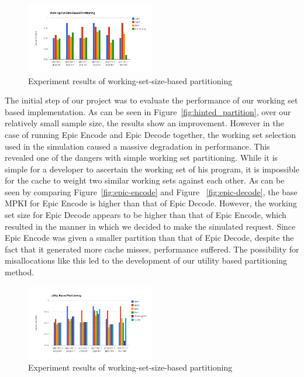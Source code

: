 \documentclass{acm_proc_article-sp}
\begin{document}
\begin{figure}
  \includegraphics[width=0.5\textwidth]{figs/work_set_size_hit_ratio.png}
  \caption{Experiment results of working-set-size-based partitioning}
  \label{fig:work_set_results}
\end{figure}

The initial step of our project was to evaluate the performance of our working set based implementation. As can be seen in Figure~\ref{fig:hinted_partition}, over our relatively small sample size, the results show an improvement. However in the case of running Epic Encode and Epic Decode together, the working set selection used in the simulation caused a 
massive degradation in performance. This revealed one of the dangers with simple working set partitioning. While it is simple for a developer to ascertain the working set of his program, it is impossible for the cache to weight two similar working sets against each other. As can be seen by comparing  Figure~\ref{fig:epic-encode} and Figure ~\ref{fig:epic-decode}, the base MPKI for Epic Encode is higher than that of Epic Decode. However, the working set size for Epic Decode appears to be higher than that of Epic Encode, which resulted in the manner in which we decided to make the simulated request. Since Epic Encode was given a smaller partition than that of Epic Decode, despite the fact that it generated more cache misses, performance suffered. The possibility for misallocations like this led to the development of our utility based partitioning method.

\begin{figure}
  \includegraphics[width=0.5\textwidth]{figs/utility_hit_ratio.png}
  \caption{Experiment results of working-set-size-based partitioning}
  \label{fig:utility_results}
\end{figure}
\end{document}
